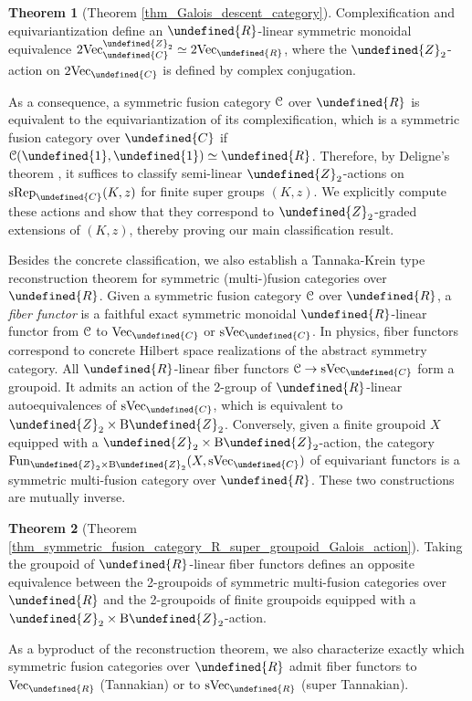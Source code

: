 \documentclass[10pt]{article}
\let\mathbb\undefined
\theoremstyle{definition}
\newtheorem{mainthm}{Theorem}
\numberwithin{equation}{section}
\numberwithin{thm}{section}
\newcommand{\Cb}{\mathbb{C}}
\newcommand{\Rb}{\mathbb{R}}
\newcommand{\Zb}{\mathbb{Z}}
\newcommand{\CC}{\EuScript{C}}
\newcommand{\rmB}{\mathrm{B}}
\DeclareMathOperator{\fun}{Fun}
\newcommand{\one}{\mathbb{1}}
\newcommand{\vect}{\mathrm{Vec}}
\newcommand{\svect}{\mathrm{sVec}}
\newcommand{\srep}{\mathrm{sRep}}
\begin{document}
\begin{mainthm}[Theorem \ref{thm_Galois_descent_category}]
Complexification and equivariantization define an $\Rb$-linear symmetric monoidal equivalence $2\vect_\Cb^{\Zb_2} \simeq 2\vect_\Rb$, where the $\Zb_2$-action on $2\vect_\Cb$ is defined by complex conjugation.
\end{mainthm}

As a consequence, a symmetric fusion category $\CC$ over $\Rb$ is equivalent to the equivariantization of its complexification, which is a symmetric fusion category over $\Cb$ if $\CC(\one,\one) \simeq \Rb$. Therefore, by Deligne's theorem \cite{Del90,Del02}, it suffices to classify semi-linear $\Zb_2$-actions on $\srep_\Cb(K,z)$ for finite super groups $(K,z)$. We explicitly compute these actions and show that they correspond to $\Zb_2$-graded extensions of $(K,z)$, thereby proving our main classification result.

Besides the concrete classification, we also establish a Tannaka-Krein type reconstruction theorem for symmetric (multi-)fusion categories over $\Rb$. Given a symmetric fusion category $\CC$ over $\Rb$, a \emph{fiber functor} is a faithful exact symmetric monoidal $\Rb$-linear functor from $\CC$ to $\vect_\Cb$ or $\svect_\Cb$. In physics, fiber functors correspond to concrete Hilbert space realizations of the abstract symmetry category. All $\Rb$-linear fiber functors $\CC \to \svect_\Cb$ form a groupoid. It admits an action of the 2-group of $\Rb$-linear autoequivalences of $\svect_\Cb$, which is equivalent to $\Zb_2 \times \rmB \Zb_2$. Conversely, given a finite groupoid $X$ equipped with a $\Zb_2 \times \rmB \Zb_2$-action, the category $\fun_{\Zb_2 \times \rmB \Zb_2}(X,\svect_\Cb)$ of equivariant functors is a symmetric multi-fusion category over $\Rb$. These two constructions are mutually inverse.

\begin{mainthm}[Theorem \ref{thm_symmetric_fusion_category_R_super_groupoid_Galois_action}]
Taking the groupoid of $\Rb$-linear fiber functors defines an opposite equivalence between the 2-groupoids of symmetric multi-fusion categories over $\Rb$ and the 2-groupoids of finite groupoids equipped with a $\Zb_2 \times \rmB \Zb_2$-action.
\end{mainthm}

As a byproduct of the reconstruction theorem, we also characterize exactly which symmetric fusion categories over $\Rb$ admit fiber functors to $\vect_\Rb$ (Tannakian) or to $\svect_\Rb$ (super Tannakian).
\end{document}

